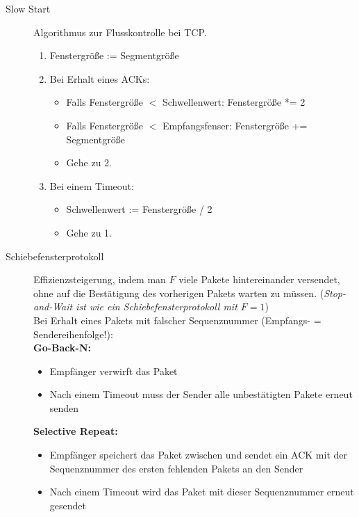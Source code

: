 \documentclass[a4paper]{article}
\begin{document}
\begin{description}
    \item[Slow Start]
    \begin{samepage}
    Algorithmus zur Flusskontrolle bei TCP.
    \begin{enumerate}
        \item Fenstergröße := Segmentgröße
        \item Bei Erhalt eines ACKs:
        \begin{itemize}
            \item Falls Fenstergröße $<$ Schwellenwert: Fenstergröße *= 2
            \item Falls Fenstergröße $<$ Empfangsfenser: Fenstergröße += Segmentgröße
            \item Gehe zu 2.
        \end{itemize}
        \item Bei einem Timeout:
        \begin{itemize}
            \item Schwellenwert := Fenstergröße / 2
            \item Gehe zu 1.
        \end{itemize}
    \end{enumerate}
    \end{samepage}
    \item[Schiebefensterprotokoll]
    \begin{samepage}
    Effizienzsteigerung, indem man $F$ viele Pakete hintereinander versendet, ohne auf die Bestätigung des vorherigen Pakets warten zu müssen. (\textit{Stop-and-Wait ist wie ein Schiebefensterprotokoll mit $F = 1$})
    \bigskip \\
    Bei Erhalt eines Pakets mit falscher Sequenznummer (Empfangs- = Sendereihenfolge!): \\
    \textbf{Go-Back-N:}
    \begin{itemize}
        \item Empfänger verwirft das Paket
        \item Nach einem Timeout muss der Sender alle unbestätigten Pakete erneut senden
    \end{itemize}
    \textbf{Selective Repeat:}
    \begin{itemize}
        \item Empfänger speichert das Paket zwischen und sendet ein ACK mit der Sequenznummer des ersten fehlenden Pakets an den Sender
        \item Nach einem Timeout wird das Paket mit dieser Sequenznummer erneut gesendet
    \end{itemize}
    \end{samepage}
\end{description}
\end{document}
